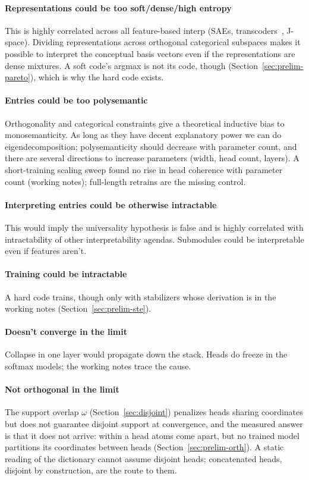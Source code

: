 \paragraph{Representations could be too soft/dense/high entropy}
This is highly correlated across all feature-based interp (SAEs,
transcoders~\cite{dunefsky2024}, J-space). Dividing representations across orthogonal
categorical subspaces makes it possible to interpret the conceptual
basis vectors even if the representations are dense mixtures. A soft
code's argmax is not its code, though (Section~\ref{sec:prelim-pareto}),
which is why the hard code exists.

\paragraph{Entries could be too polysemantic}
Orthogonality and categorical constraints give a theoretical inductive
bias to monosemanticity. As long as they have decent explanatory power
we can do eigendecomposition; polysemanticity should decrease with
parameter count, and there are several directions to increase parameters
(width, head count, layers). A short-training scaling sweep found no rise
in head coherence with parameter count (working notes); full-length
retrains are the missing control.

\paragraph{Interpreting entries could be otherwise intractable}
This would imply the universality hypothesis is false and is highly
correlated with intractability of other interpretability agendas.
Submodules could be interpretable even if features aren't.

\paragraph{Training could be intractable}
A hard code trains, though only with stabilizers whose derivation is in
the working notes (Section~\ref{sec:prelim-ste}).

\paragraph{Doesn't converge in the limit}
Collapse in one layer would propagate down the stack. Heads do freeze in
the softmax models; the working notes trace the cause.

\paragraph{Not orthogonal in the limit}
The support overlap $\omega$ (Section~\ref{sec:disjoint}) penalizes heads
sharing coordinates but does not guarantee disjoint support at
convergence, and the measured answer is that it does not arrive: within a
head atoms come apart, but no trained model partitions its coordinates
between heads (Section~\ref{sec:prelim-orth}). A static reading of the
dictionary cannot assume disjoint heads; concatenated heads, disjoint by
construction, are the route to them.

